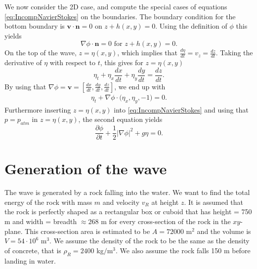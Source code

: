 \documentclass[11pt]{article}
\begin{document}
We now consider the 2D case, and compute the special cases of equations \eqref{eq:IncompNavierStokes} on the boundaries. 
The boundary condition for the bottom boundary is $\bm{v} \cdot \bm{n} = 0 $ on $z + h(x,y) = 0$. Using the definition of $\phi$ this yields
\begin{equation}
    \label{eq:phit}%
    \nabla \phi  \cdot \bm{n} = 0 \text{ for } z + h(x,y) = 0. 
\end{equation}
On the top of the wave, $z = \eta(x,y)$, which implies that $\frac{d\eta}{dt} = v_z = \frac{dz}{dt}$. Taking the derivative of $\eta$ with respect to $t$, this gives for $z = \eta(x,y)$
\begin{equation*}
    \eta_t + \eta_x\frac{dx}{dt} + \eta_y\frac{dy}{dt} = \frac{dz}{dt}. 
\end{equation*}
By using that $\nabla\phi = \bm{v} = [\frac{dx}{dt}, \frac{dy}{dt}, \frac{dz}{dt}]$, we end up with
\begin{align}
    \label{eq:etaEq}%
    \eta_t + \nabla\phi\cdot \big(\eta_x, \eta_y, - 1\big) = 0.
\end{align}
Furthermore inserting $z = \eta(x,y)$ into \eqref{eq:IncompNavierStokes} and using that $p = p_{atm}$ in $z = \eta(x,y)$, the second equation yields
\begin{equation}
    \label{eq:phiEq}
    \frac{\partial \phi }{\partial t} + \frac{1}{2}|\nabla \phi |^2 + g\eta = 0.
\end{equation}
%
%
\section{Generation of the wave}
The wave is generated by a rock falling into the water. We want to find the total energy of the rock with mass $m$ and velocity $v_R$ at height $z$. It is assumed that the rock is
perfectly shaped as a rectangular box or cuboid that has height = 750 m and  width = breadth $\approx 268$ m for every cross-section of the rock in the $xy$-plane. This cross-section area
is estimated to be  $A=72000$ m$^2$ and the volume is $V= 54 \cdot 10^6$ m$^3$. We assume the density of the rock to be the same as the density of concrete, that is $\rho_{R}=2400$ kg$/$m$^3$.
We also assume the rock falls 150 m before landing in water.
\end{document}
